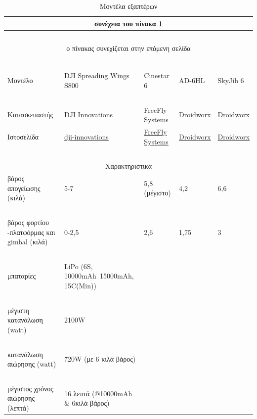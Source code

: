 \documentclass[a4paper, 12pt, twoside]{report}
\begin{document}
{{{{{{			\begin{landscape}	
			\setlength\LTleft{0pt}            %
			\setlength\LTright{0pt}           %
	
			\begin{longtable} { m{3cm} m{3.5cm} m{3.5cm} m{3.5cm} m{3.5cm} }
					\caption [Μοντέλα εξαπτέρων]{Μοντέλα εξαπτέρων}
					\label{πιν.:Μοντέλα εξαπτέρων}\\
					\hline
					\endfirsthead
					\multicolumn{5}{c}{συνέχεια του πίνακα \ref{πιν.:Μοντέλα εξαπτέρων}}\\
					\hline
					~\\
					\endhead
					\hline
					\multicolumn{5}{c}{ο πίνακας συνεχίζεται στην επόμενη σελίδα}\\
					\endfoot
					\multicolumn{5}{c}{ολοκληρώθηκε ο πίνακας \ref{πιν.:Μοντέλα εξαπτέρων}}\\
					\endlastfoot
					~\\
					Μοντέλο & DJI Spreading Wings S800 & Cinestar 6 & AD-6HL & SkyJib 6\\
					\hdashline
					~\\
					Κατασκευαστής & DJI Innovations & FreeFly Systems & Droidworx & Droidworx\\
					Ιστοσελίδα & \href{http://www.dji-innovations.com/products/spreading-wings-s800/overview/}{dji-innovations} & \href{http://www.freeflysystems.com/products/cinestar-6.php}{FreeFly Systems} & \href{http://www.droidworx.com.au/ADseries.html}{Droidworx} & \href{http://www.droidworx.com.au/skyjib.html}{Droidworx}\\
					\hdashline
					~\\
					\multicolumn{5}{c}{Χαρακτηριστικά}\\
					\hdashline
					βάρος απογείωσης (κιλά) & 5-7 & 5,8 (μέγιστο) & 4,2 & 6,6\\
					~\\
					βάρος φορτίου -πλατφόρμας και gimbal (κιλά) & 0-2,5 & 2,6 & 1,75 & 3\\
					~\\
					μπαταρίες & LiPo (6S, 10000mAh~15000mAh, 15C(Min)) & & & \\
					~\\
					μέγιστη κατανάλωση (watt) & 2100W & & & \\
					~\\
					κατανάλωση αιώρησης (watt) & 720W (με 6 κιλά βάρος) & & & \\
					~\\
					μέγιστος χρόνος αιώρησης (λεπτά) & 16 λεπτά (@10000mAh \& 6κιλά βάρος) & & & \\

\end{longtable}
\end{landscape}}}}}}}
\end{document}
